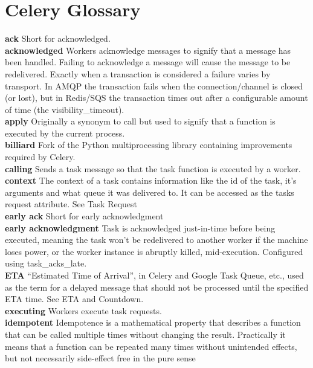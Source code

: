 \documentclass [8pt] {extarticle}
\begin{document}
    \pagebreak

    \section {Celery Glossary}

\textbf {ack} \quad Short for acknowledged. \\
\textbf {acknowledged} \quad Workers acknowledge messages to signify that a
message has been handled. Failing to acknowledge a message will cause the
message to be redelivered. Exactly when a transaction is considered a failure
varies by transport. In AMQP the transaction fails when the connection/channel
is closed (or lost), but in Redis/SQS the transaction times out after a
configurable amount of time (the visibility\_timeout). \\
\textbf {apply} \quad Originally a synonym to call but used to signify that a
function is executed by the current process. \\
\textbf {billiard} \quad Fork of the Python multiprocessing library containing
improvements required by Celery. \\
\textbf {calling} \quad Sends a task message so that the task function is
executed by a worker. \\
\textbf {context} \quad The context of a task contains information like the id
of the task, it’s arguments and what queue it was delivered to. It can be
accessed as the tasks request attribute. See Task Request \\
\textbf {early ack} \quad Short for early acknowledgment \\
\textbf {early acknowledgment} \quad Task is acknowledged just-in-time before
being executed, meaning the task won’t be redelivered to another worker if the
machine loses power, or the worker instance is abruptly killed, mid-execution.
Configured using task\_acks\_late. \\
\textbf {ETA} \quad “Estimated Time of Arrival”, in Celery and Google Task Queue,
etc., used as the term for a delayed message that should not be processed
until the specified ETA time. See ETA and Countdown.  \\
\textbf {executing} \quad Workers execute task requests.  \\
\textbf {idempotent} \quad Idempotence is a mathematical property that describes a
function that can be called multiple times without changing the result.
Practically it means that a function can be repeated many times without
unintended effects, but not necessarily side-effect free in the pure sense
\end{document}
